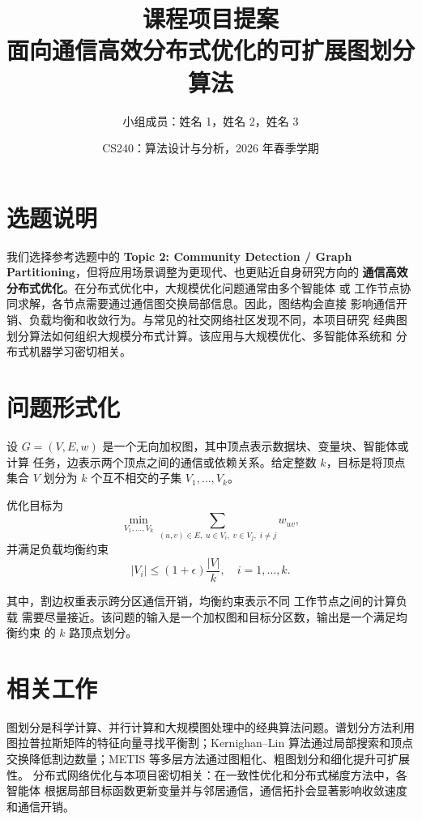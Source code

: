 \documentclass[UTF8, 10pt]{ctexart}
\title{\textbf{课程项目提案}\\
面向通信高效分布式优化的可扩展图划分算法}
\author{小组成员：姓名 1，姓名 2，姓名 3}
\date{CS240：算法设计与分析，2026 年春季学期}
\begin{document}
\maketitle

\section{选题说明}

我们选择参考选题中的 \textbf{Topic 2: Community Detection / Graph
Partitioning}，但将应用场景调整为更现代、也更贴近自身研究方向的
\textbf{通信高效分布式优化}。在分布式优化中，大规模优化问题通常由多个智能体
或 工作节点协同求解，各节点需要通过通信图交换局部信息。因此，图结构会直接
影响通信开销、负载均衡和收敛行为。与常见的社交网络社区发现不同，本项目研究
经典图划分算法如何组织大规模分布式计算。该应用与大规模优化、多智能体系统和
分布式机器学习密切相关。

\section{问题形式化}

设 $G=(V,E,w)$ 是一个无向加权图，其中顶点表示数据块、变量块、智能体或计算
任务，边表示两个顶点之间的通信或依赖关系。给定整数 $k$，目标是将顶点集合
$V$ 划分为 $k$ 个互不相交的子集 $V_1,\ldots,V_k$。

优化目标为
\[
    \min_{V_1,\ldots,V_k}
    \sum_{(u,v)\in E,\; u\in V_i,\; v\in V_j,\; i\neq j} w_{uv},
\]
并满足负载均衡约束
\[
    |V_i| \leq (1+\epsilon)\frac{|V|}{k},
    \quad i=1,\ldots,k.
\]

其中，割边权重表示跨分区通信开销，均衡约束表示不同 工作节点之间的计算负载
需要尽量接近。该问题的输入是一个加权图和目标分区数，输出是一个满足均衡约束
的 $k$ 路顶点划分。

\section{相关工作}

图划分是科学计算、并行计算和大规模图处理中的经典算法问题。谱划分方法利用
图拉普拉斯矩阵的特征向量寻找平衡割；Kernighan--Lin 算法通过局部搜索和顶点
交换降低割边数量；METIS 等多层方法通过图粗化、粗图划分和细化提升可扩展性。
分布式网络优化与本项目密切相关：在一致性优化和分布式梯度方法中，各智能体
根据局部目标函数更新变量并与邻居通信，通信拓扑会显著影响收敛速度和通信开销。
\end{document}
